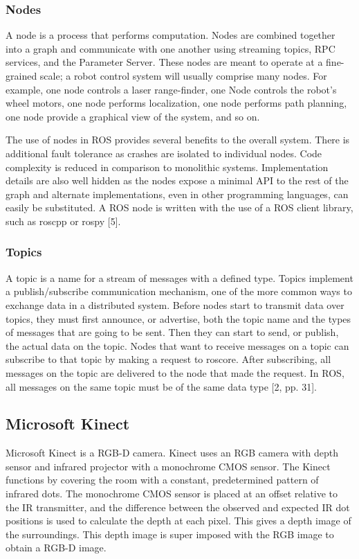 \documentclass[journal]{IEEEtran}
\begin{document}
\subsubsection{Nodes}
A node is a process that performs computation. Nodes are combined together into a graph and communicate with one another using streaming topics, RPC services, and the Parameter Server. These nodes are meant to operate at a fine-grained scale; a robot control system will usually comprise many nodes. For example, one node controls a laser range-finder, one Node controls the robot's wheel motors, one node performs localization, one node performs path planning, one node provide a graphical view of the system, and so on.

The use of nodes in ROS provides several benefits to the overall system. There is additional fault tolerance as crashes are isolated to individual nodes. Code complexity is reduced in comparison to monolithic systems. Implementation details are also well hidden as the nodes expose a minimal API to the rest of the graph and alternate implementations, even in other programming languages, can easily be substituted.
A ROS node is written with the use of a ROS client library, such as roscpp or rospy [5].

\subsubsection{Topics}
A topic is a name for a stream of messages with a defined type. Topics implement a publish/subscribe communication mechanism, one of the more common ways to exchange data in a distributed system. Before nodes start to transmit data over topics, they must first announce, or advertise, both the topic name and the types of messages that are going to be sent. Then they can start to send, or publish, the actual data on the topic. 
Nodes that want to receive messages on a topic can subscribe to that topic by
making a request to roscore. After subscribing, all messages on the topic are delivered to
the node that made the request.
In ROS, all messages on the same topic must be of the same data type [2, pp. 31].	
 
\subsection{Microsoft Kinect}
Microsoft Kinect is a RGB-D camera.
Kinect uses an RGB camera with depth sensor and infrared projector with a monochrome CMOS sensor. The Kinect functions by covering the room with a constant, predetermined pattern of infrared dots. The monochrome CMOS sensor is placed at an offset relative to the IR transmitter, and the difference between the observed and expected IR dot positions is used to calculate the depth at each pixel. This gives a depth image of the surroundings. This depth image is super imposed with the RGB image to obtain a RGB-D image.
\end{document}
